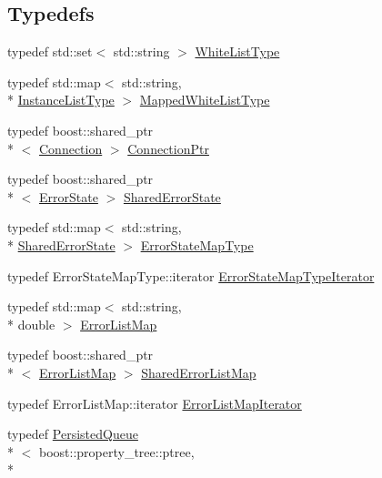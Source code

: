 \subsection*{Typedefs}
\begin{DoxyCompactItemize}
\item 
typedef std\-::set$<$ std\-::string $>$ \hyperlink{namespacekisscpp_a6aa00ccbe46e3a892fa90d3fbf6e3439}{White\-List\-Type}
\item 
typedef std\-::map$<$ std\-::string, \\*
\hyperlink{structkisscpp_1_1_instance_list_type}{Instance\-List\-Type} $>$ \hyperlink{namespacekisscpp_a33979b59a2b404e85c9416071d843412}{Mapped\-White\-List\-Type}
\item 
typedef boost\-::shared\-\_\-ptr\\*
$<$ \hyperlink{classkisscpp_1_1_connection}{Connection} $>$ \hyperlink{namespacekisscpp_a4632e92aebdc8fa1c220da260469cbb2}{Connection\-Ptr}
\item 
typedef boost\-::shared\-\_\-ptr\\*
$<$ \hyperlink{classkisscpp_1_1_error_state}{Error\-State} $>$ \hyperlink{namespacekisscpp_af77de115307b379cbcab83a1fc54fdad}{Shared\-Error\-State}
\item 
typedef std\-::map$<$ std\-::string, \\*
\hyperlink{namespacekisscpp_af77de115307b379cbcab83a1fc54fdad}{Shared\-Error\-State} $>$ \hyperlink{namespacekisscpp_ab99725cc511536c050d9cab582313d0c}{Error\-State\-Map\-Type}
\item 
typedef Error\-State\-Map\-Type\-::iterator \hyperlink{namespacekisscpp_a37b3f68e4626dc05d9d2381803a889b4}{Error\-State\-Map\-Type\-Iterator}
\item 
typedef std\-::map$<$ std\-::string, \\*
double $>$ \hyperlink{namespacekisscpp_a325b559f17774bf1155d5dda8fe335e3}{Error\-List\-Map}
\item 
typedef boost\-::shared\-\_\-ptr\\*
$<$ \hyperlink{namespacekisscpp_a325b559f17774bf1155d5dda8fe335e3}{Error\-List\-Map} $>$ \hyperlink{namespacekisscpp_a52b7a11959a119c1da931042d7751db0}{Shared\-Error\-List\-Map}
\item 
typedef Error\-List\-Map\-::iterator \hyperlink{namespacekisscpp_a5493eddaf40e71c5f85672b1ab37afcb}{Error\-List\-Map\-Iterator}
\item 
typedef \hyperlink{classkisscpp_1_1_persisted_queue}{Persisted\-Queue}\\*
$<$ boost\-::property\-\_\-tree\-::ptree, \\*

\end{DoxyCompactItemize}
